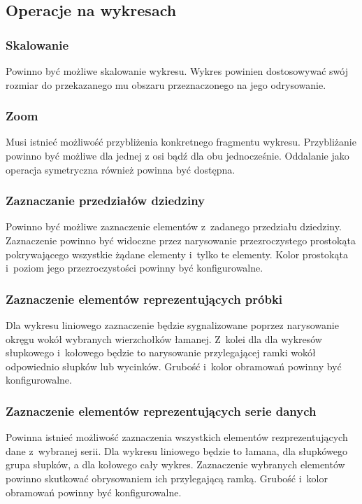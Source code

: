 \documentclass[11pt,twoside,a4paper,final]{article}
\begin{document}
\subsection{Operacje na wykresach}
\subsubsection{Skalowanie}
Powinno być możliwe skalowanie wykresu. Wykres powinien dostosowywać swój rozmiar do przekazanego mu obszaru przeznaczonego na jego odrysowanie.

\subsubsection{Zoom}
Musi istnieć możliwość przybliżenia konkretnego fragmentu wykresu. Przybliżanie powinno być możliwe dla jednej z osi bądź dla obu jednocześnie. Oddalanie jako operacja symetryczna również powinna być dostępna.

\subsubsection{Zaznaczanie przedziałów dziedziny}
Powinno być możliwe zaznaczenie elementów z~zadanego przedziału dziedziny. Zaznaczenie powinno być widoczne przez narysowanie przezroczystego prostokąta pokrywającego wszystkie żądane elementy i~tylko te elementy. Kolor prostokąta i~poziom jego przezroczystości powinny być konfigurowalne.

\subsubsection{Zaznaczenie elementów reprezentujących próbki}
Dla wykresu liniowego zaznaczenie będzie sygnalizowane poprzez narysowanie okręgu wokół wybranych wierzchołków łamanej. Z~kolei dla dla wykresów słupkowego i~kołowego będzie to narysowanie przylegającej ramki wokół odpowiednio słupków lub wycinków. Grubość i~kolor obramowań powinny być konfigurowalne.

\subsubsection{Zaznaczenie elementów reprezentujących serie danych}
Powinna istnieć możliwość zaznaczenia wszystkich elementów rezprezentujących dane z~wybranej serii. Dla wykresu liniowego będzie to łamana, dla słupkówego grupa słupków, a dla kołowego cały wykres. Zaznaczenie wybranych elementów powinno skutkować obrysowaniem ich przylegającą ramką.
Grubość i~kolor obramowań powinny być konfigurowalne.
\end{document}

